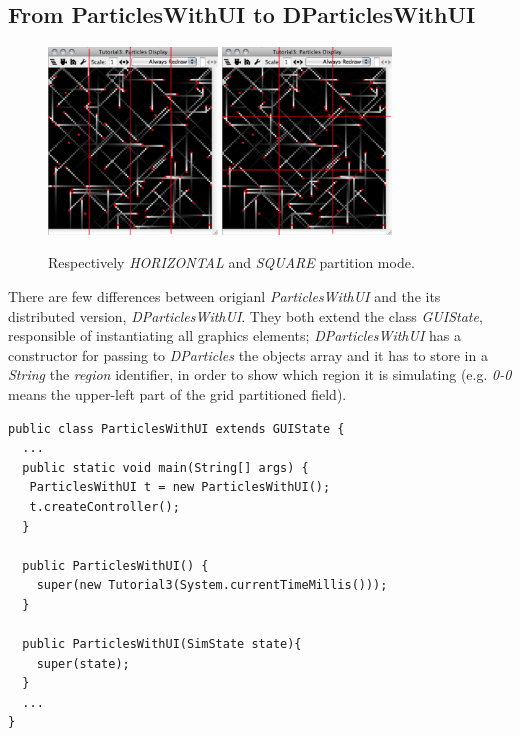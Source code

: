 \documentclass[12pt]{article}
\begin{document}
\subsection{From ParticlesWithUI to DParticlesWithUI}
\begin{figure}
	\centering
		\includegraphics[width=0.4\textwidth,bb=0 0 470 520]{particles-h.png}	
		\includegraphics[width=0.4\textwidth,bb=0 0 470 520]{particles-m.png}
		\caption{Respectively \textit{HORIZONTAL} and \textit{SQUARE} partition mode.}
	\label{fig:dp01}
\end{figure}

There are few differences between origianl \textit{ParticlesWithUI} and the its distributed version, \textit{DParticlesWithUI}. They both extend the class \textit{GUIState}, responsible of instantiating all graphics elements; \textit{DParticlesWithUI} has a constructor for passing to \textit{DParticles} the objects array and it has to store in a \textit{String} the \textit{region} identifier, in order to show which region it is simulating (e.g. \textit{0-0} means the upper-left part of the grid partitioned field).

\begin{lstlisting}
public class ParticlesWithUI extends GUIState {
  ...
  public static void main(String[] args) {
   ParticlesWithUI t = new ParticlesWithUI();
   t.createController();
  }
  
  public ParticlesWithUI() { 
  	super(new Tutorial3(System.currentTimeMillis()));
  }
  
  public ParticlesWithUI(SimState state){
  	super(state);
  }
  ...
}
\end{lstlisting}
\medskip
\end{document}

